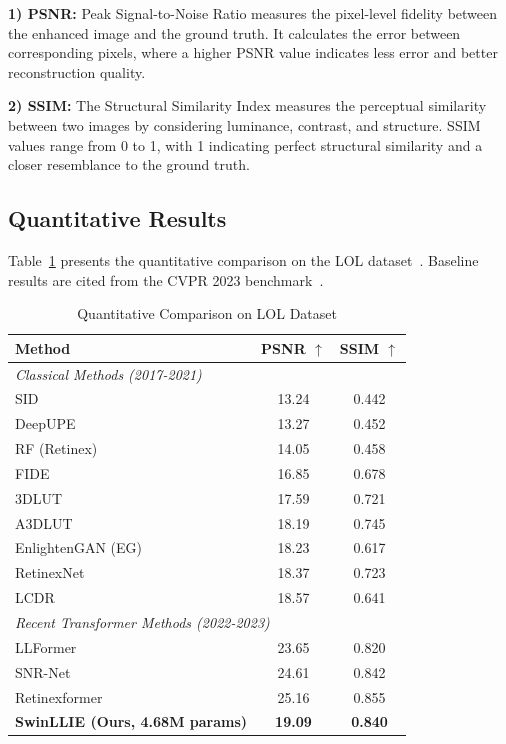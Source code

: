 \documentclass[conference]{IEEEtran}
\begin{document}
\textbf{1) PSNR:} Peak Signal-to-Noise Ratio measures the pixel-level fidelity between the enhanced image and the ground truth. It calculates the error between corresponding pixels, where a higher PSNR value indicates less error and better reconstruction quality.

\textbf{2) SSIM:} The Structural Similarity Index measures the perceptual similarity between two images by considering luminance, contrast, and structure. SSIM values range from 0 to 1, with 1 indicating perfect structural similarity and a closer resemblance to the ground truth.

\subsection{Quantitative Results}

Table~\ref{tab:results} presents the quantitative comparison on the LOL dataset~\cite{lol_dataset}. Baseline results are cited from the CVPR 2023 benchmark~\cite{xu2023smg}.

\begin{table}[htbp]
\caption{Quantitative Comparison on LOL Dataset}
\centering
\begin{tabular}{lcc}
\toprule
\textbf{Method} & \textbf{PSNR $\uparrow$} & \textbf{SSIM $\uparrow$} \\
\midrule
\multicolumn{3}{l}{\textit{Classical Methods (2017-2021)}} \\
SID & 13.24 & 0.442 \\
DeepUPE & 13.27 & 0.452 \\
RF (Retinex) & 14.05 & 0.458 \\
FIDE & 16.85 & 0.678 \\
3DLUT & 17.59 & 0.721 \\
A3DLUT & 18.19 & 0.745 \\
EnlightenGAN (EG) & 18.23 & 0.617 \\
RetinexNet & 18.37 & 0.723 \\
LCDR & 18.57 & 0.641 \\
\midrule
\multicolumn{3}{l}{\textit{Recent Transformer Methods (2022-2023)}} \\
LLFormer~\cite{wang2023llformer} & 23.65 & 0.820 \\
SNR-Net~\cite{xu2022snrnet} & 24.61 & 0.842 \\
Retinexformer~\cite{cai2023retinexformer} & 25.16 & 0.855 \\
\midrule
\textbf{SwinLLIE (Ours, 4.68M params)} & \textbf{19.09} & \textbf{0.840} \\
\bottomrule
\end{tabular}
\label{tab:results}
\end{table}
\end{document}
